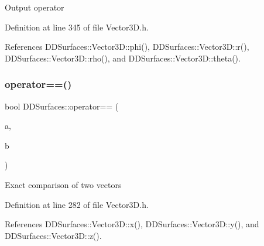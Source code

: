 Output operator 

Definition at line 345 of file Vector3\+D.\+h.



References D\+D\+Surfaces\+::\+Vector3\+D\+::phi(), D\+D\+Surfaces\+::\+Vector3\+D\+::r(), D\+D\+Surfaces\+::\+Vector3\+D\+::rho(), and D\+D\+Surfaces\+::\+Vector3\+D\+::theta().

\hypertarget{namespace_d_d_surfaces_a2fac63bbe49a2ac54035b3b5100241b4}{}\label{namespace_d_d_surfaces_a2fac63bbe49a2ac54035b3b5100241b4} 
\subsubsection{\texorpdfstring{operator==()}{operator==()}}
{\footnotesize\ttfamily bool D\+D\+Surfaces\+::operator== (\begin{DoxyParamCaption}\item[{const \hyperlink{class_d_d_surfaces_1_1_vector3_d}{Vector3D} \&}]{a,  }\item[{const \hyperlink{class_d_d_surfaces_1_1_vector3_d}{Vector3D} \&}]{b }\end{DoxyParamCaption})\hspace{0.3cm}{\ttfamily [inline]}}

Exact comparison of two vectors 

Definition at line 282 of file Vector3\+D.\+h.



References D\+D\+Surfaces\+::\+Vector3\+D\+::x(), D\+D\+Surfaces\+::\+Vector3\+D\+::y(), and D\+D\+Surfaces\+::\+Vector3\+D\+::z().

